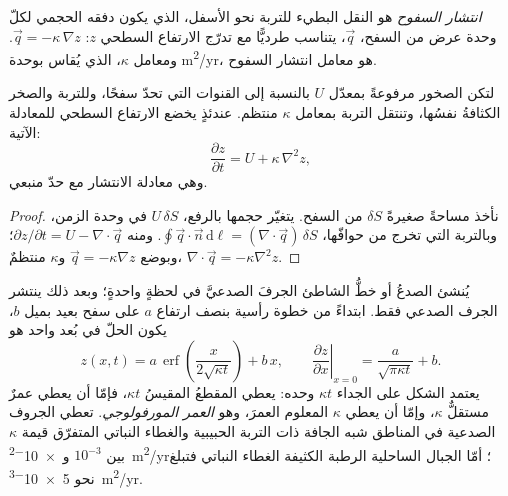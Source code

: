 \begin{definition}\label{def:b3:quantitative-geomorphology:diffusion}
\emph{انتشار السفوح} هو النقل البطيء للتربة نحو الأسفل،
الذي يكون دفقه الحجمي لكلّ وحدة عرض من السفح،
$\vec q$، يتناسب طرديًّا مع تدرّج الارتفاع السطحي $z$:
$\vec q = -\kappa\,\nabla z$. ومعامل $\kappa$، الذي يُقاس بوحدة
\unit{m^2/yr}، هو معامل انتشار السفوح.
\end{definition}

\begin{theorem}\label{thm:b3:quantitative-geomorphology:diffusion}
لتكن الصخور مرفوعةً بمعدّل $U$ بالنسبة إلى القنوات التي تحدّ
سفحًا، وللتربة والصخر الكثافةُ نفسُها، وتنتقل التربة 
بمعامل $\kappa$ منتظم. عندئذٍ يخضع الارتفاع السطحي للمعادلة الآتية:
\[
\frac{\partial z}{\partial t} = U + \kappa\,\nabla^2 z ,
\]
وهي معادلة الانتشار مع حدّ منبعي.
\end{theorem}

\begin{proof}
نأخذ مساحةً صغيرةً $\delta S$ من السفح. يتغيّر حجمها بالرفع،
$U\,\delta S$ في وحدة الزمن، وبالتربة التي تخرج من
حوافّها، $\oint \vec q\cdot\vec n\,\mathrm{d}\ell = (\nabla\cdot\vec q)\,\delta S$.
ومنه $\partial z/\partial t = U - \nabla\cdot\vec q$؛ وبوضع $\vec q = -\kappa
\nabla z$ و$\kappa$ منتظمٌ، $\nabla\cdot\vec q = -\kappa\nabla^2 z$.
\end{proof}

يُنشئ الصدعُ أو خطُّ الشاطئ الجرفَ الصدعيَّ في لحظةٍ واحدةٍ؛ وبعد ذلك
ينتشر الجرف الصدعي فقط. ابتداءً من خطوة رأسية بنصف ارتفاع $a$ على
سفح بعيد بميل $b$، يكون الحلّ في بُعد واحد هو
\[
z(x,t) = a\,\operatorname{erf}\!\left(\frac{x}{2\sqrt{\kappa t}}\right) + b\,x ,
\qquad
\left.\frac{\partial z}{\partial x}\right|_{x=0} = \frac{a}{\sqrt{\pi\kappa t}} + b .
\]
يعتمد الشكل على الجداء $\kappa t$ وحده: يعطي المقطعُ المقيسُ
$\kappa t$، فإمّا أن يعطي عمرٌ مستقلٌّ $\kappa$، وإمّا أن يعطي
$\kappa$ المعلوم العمرَ، وهو \emph{العمر المورفولوجي}. تعطي الجروف الصدعية في المناطق
شبه الجافة ذات التربة الحبيبية والغطاء النباتي المتفرّق قيمة $\kappa$ بين
$10^{-3}$ و\qty{e-2}{m^2/yr}؛ أمّا الجبال الساحلية الرطبة الكثيفة الغطاء النباتي
فتبلغ نحو \qty{5e-3}{m^2/yr}.

